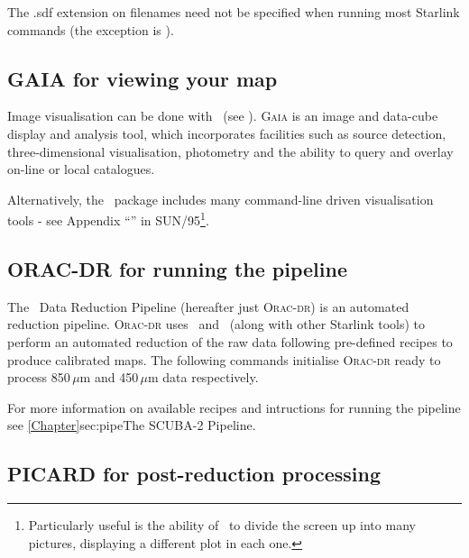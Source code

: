 \begin{tip}
The .sdf extension on filenames need not be specified when running most
Starlink commands (the exception is \picard).
\end{tip}


\subsection{GAIA for viewing your map}

Image visualisation can be done with \gaia\ (see
\gaiasun). \textsc{Gaia} is an image and data-cube display and
analysis tool, which incorporates facilities such as source detection,
three-dimensional visualisation, photometry and the ability to query
and overlay on-line or local catalogues.
\begin{terminalv}
\end{terminalv}

Alternatively, the \Kappa\ package includes many command-line driven
visualisation tools - see Appendix ``'' in SUN/95\footnote{Particularly useful is the
ability of \Kappa\ to divide the screen up into many pictures, displaying
a different plot in each one.}.

\subsection{ORAC-DR for running the pipeline}

The \oracdr\ Data Reduction Pipeline \cite{oracdr} (hereafter just
\textsc{Orac-dr}) is an automated reduction pipeline. \textsc{Orac-dr}
uses \smurf\ and \Kappa\ (along with other Starlink tools) to perform
an automated reduction of the raw data following pre-defined recipes
to produce calibrated maps.  The following commands initialise
\textsc{Orac-dr} ready to process 850\,$\mu$m and 450\,$\mu$m data
respectively.
\begin{terminalv}
\end{terminalv}
For more information on available recipes and intructions for running the pipeline
see \cref{Chapter}{sec:pipe}{The SCUBA-2 Pipeline}.

\subsection{PICARD for post-reduction processing}


